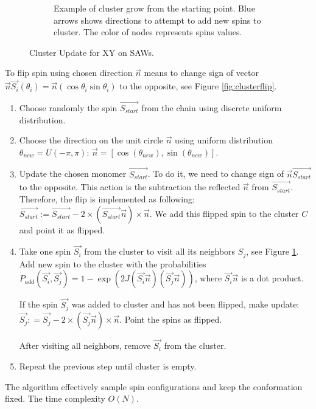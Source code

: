 \begin{figure}
\begin{subfigure}[b]{0.45\textwidth}
		\caption{  Example of cluster grow from the starting point. Blue arrows shows directions to attempt to add new spins to cluster. The color of nodes represents spins values. }
		\label{fig:clustergrowth}
	\end{subfigure}
	\caption{ Cluster Update for XY on SAWs.  }
	\label{fig:ClusterUpdate}
\end{figure}


To flip spin  using chosen direction $\vec{n}$ means to change sign of vector $ \vec{n} \vec{S_i} (\theta_i) = \vec{n}(\cos \theta_i \sin \theta_i  )$  to the opposite, see Figure \ref{fig:clusterflip}. 
 
 


\begin{enumerate}
	
	\item Choose randomly the spin $\overrightarrow{S_{start}}$ from the chain using discrete uniform distribution. 
	
	\item Choose the direction on the unit circle $\overrightarrow{n}$ using uniform distribution $ \theta_{new} = U(-\pi, \pi)$: $\overrightarrow{n} = [\cos(\theta_{new}), \sin(\theta_{new})]$.
	
	\item Update the chosen monomer $\overrightarrow{S_{start}}$. To do it, we need to change sign of $ \vec{n}  \overrightarrow{S_{start}} $ to the opposite. This action is the subtraction the reflected  $\vec{n}$  from $ \overrightarrow{S_{start}} $. Therefore, the flip is implemented as following: $\overrightarrow{S_{start}} := \overrightarrow{S_{start}} - 2 \times ( \overrightarrow{S_{start}} \vec{n}) \times \vec{n}$. We add this flipped spin to the cluster $C$ and point it as flipped.
	
	\item Take one spin $ \overrightarrow{S_{i}}$ from the cluster to visit all its neighbors $S_j$, see Figure \ref{fig:clustergrowth}. Add new spin to the cluster with the probabilities $P_{add}(\overrightarrow{S_{i}}, \overrightarrow{S_{j}} ) = 1 - \exp \left(2J (\overrightarrow{S_{i}}\overrightarrow{n})( \overrightarrow{S_{j}} \overrightarrow{n} ) \right)$, where $\overrightarrow{S_{i}}\overrightarrow{n}$ is a dot product. 
	
	If the spin $\overrightarrow{S_{j}}$ was added to cluster and has not been flipped, make update: $\overrightarrow{S_{j}} : = \overrightarrow{S_{j}} - 2 \times ( \overrightarrow{S_{j}} \vec{n}) \times \vec{n}$. Point the spins as flipped.
	
	After visiting all neighbors, remove  $ \overrightarrow{S_{i}}$ from the cluster.
	
	\item Repeat the previous step until cluster is empty. 
	
\end{enumerate}

The algorithm effectively sample spin configurations and keep the conformation fixed. The time complexity $O(N)$. 
 


